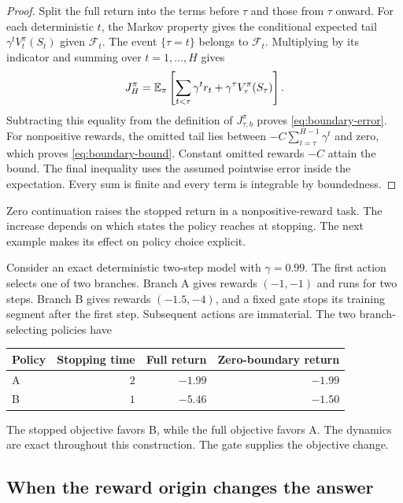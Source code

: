 \begin{proof}
Split the full return into the terms before $\tau$ and those from $\tau$ onward. For each deterministic $t$, the Markov property gives the conditional expected tail $\gamma^tV_t^\pi(S_t)$ given $\mathcal F_t$. The event $\{\tau=t\}$ belongs to $\mathcal F_t$. Multiplying by its indicator and summing over $t=1,\ldots,H$ gives
\[
J_H^\pi=\mathbb{E}_\pi\left[\sum_{t<\tau}\gamma^t r_t+\gamma^\tau V_\tau^\pi(S_\tau)\right].
\]
Subtracting this equality from the definition of $J_{\tau,b}^\pi$ proves \eqref{eq:boundary-error}. For nonpositive rewards, the omitted tail lies between $-C\sum_{t=\tau}^{H-1}\gamma^t$ and zero, which proves \eqref{eq:boundary-bound}. Constant omitted rewards $-C$ attain the bound. The final inequality uses the assumed pointwise error inside the expectation. Every sum is finite and every term is integrable by boundedness.
\end{proof}

Zero continuation raises the stopped return in a nonpositive-reward task. The increase depends on which states the policy reaches at stopping. The next example makes its effect on policy choice explicit.

\begin{example}
\label{ex:stopping}
Consider an exact deterministic two-step model with $\gamma=0.99$. The first action selects one of two branches. Branch A gives rewards $(-1,-1)$ and runs for two steps. Branch B gives rewards $(-1.5,-4)$, and a fixed gate stops its training segment after the first step. Subsequent actions are immaterial. The two branch-selecting policies have
\begin{center}
\begin{tabular}{lrrr}
\toprule
Policy & Stopping time & Full return & Zero-boundary return\\
\midrule
A & $2$ & $-1.99$ & $-1.99$\\
B & $1$ & $-5.46$ & $-1.50$\\
\bottomrule
\end{tabular}
\end{center}
The stopped objective favors B, while the full objective favors A. The dynamics are exact throughout this construction. The gate supplies the objective change.
\end{example}

\subsection{When the reward origin changes the answer}

